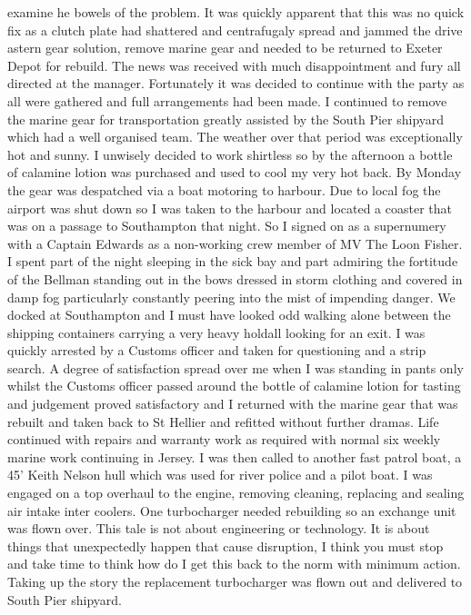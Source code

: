 examine he bowels of the problem. It was quickly apparent that this was no
quick fix as a clutch plate had shattered and centrafugaly spread and jammed
the drive astern gear solution, remove marine gear and needed to be returned to
Exeter Depot for rebuild. The news was received with much disappointment and
fury all directed at the manager. Fortunately it was decided to continue with
the party as all were gathered and full arrangements had been made. I continued
to remove the marine gear for transportation greatly assisted by the South Pier
shipyard which had a well organised team. The weather over that period was
exceptionally hot and sunny. I unwisely decided to work shirtless so by the
afternoon a bottle of calamine lotion was purchased and used to cool my very
hot back. By Monday the gear was despatched via a boat motoring to harbour. Due
to local fog the airport was shut down so I was taken to the harbour and
located a coaster that was on a passage to Southampton that night. So I signed
on as a supernumery with a Captain Edwards as a non-working crew member of MV
The Loon Fisher. I spent part of the night sleeping in the sick bay and part
admiring the fortitude of the Bellman standing out in the bows dressed in storm
clothing and covered in damp fog particularly constantly peering into the mist
of impending danger. We docked at Southampton and I must have looked odd
walking alone between the shipping containers carrying a very heavy holdall
looking for an exit. I was quickly arrested by a Customs officer and taken for
questioning and a strip search. A degree of satisfaction spread over me when I
was standing in pants only whilst the Customs officer passed around the bottle
of calamine lotion for tasting and judgement proved satisfactory and I returned
with the marine gear that was rebuilt and taken back to St Hellier and refitted
without further dramas. Life continued with repairs and warranty work as
required with normal six weekly marine work continuing in Jersey. I was then
called to another fast patrol boat, a 45' Keith Nelson hull which was used for
river police and a pilot boat. I was engaged on a top overhaul to the engine,
removing cleaning, replacing and sealing air intake inter coolers. One
turbocharger needed rebuilding so an exchange unit was flown over. This tale
is not about engineering or technology. It is about things that unexpectedly
happen that cause disruption, I think you must stop and take time to think how
do I get this back to the norm with minimum action. Taking up the story the
replacement turbocharger was flown out and delivered to South Pier shipyard.
